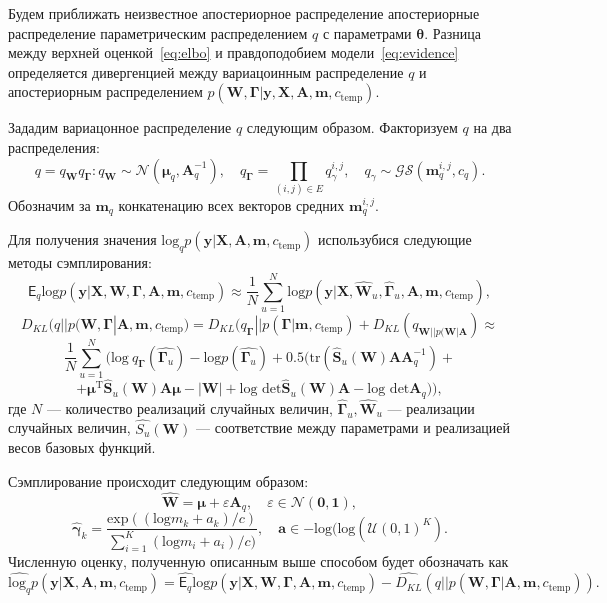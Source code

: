 Будем приближать неизвестное апостериорное распределение апостериорные распределение параметрическим распределением $q$ с параметрами $\boldsymbol{\theta}$.
Разница между верхней оценкой~\eqref{eq:elbo} и правдоподобием модели~\eqref{eq:evidence} определяется дивергенцией между вариацоинным распределение $q$ и апостериорным распределением $p(\mathbf{W}, \boldsymbol{\Gamma}|\mathbf{y}, \mathbf{X}, \mathbf{A},\mathbf{m}, c_{\text{temp}})$. 

Зададим вариацонное распределение $q$ следующим образом. 
Факторизуем $q$ на два распределения: 
$$q = q_{\mathbf{W}}q_{\boldsymbol{\Gamma}}:
q_{\mathbf{W}} \sim \mathcal{N}(\boldsymbol{\mu}_q, \mathbf{A}^{-1}_q), \quad q_{\boldsymbol{\Gamma}} = \prod_{(i,j) \in E} q_\gamma^{i,j}, \quad q_\gamma \sim \mathcal{GS}( \mathbf{m}_q^{i,j}, c_q).$$
Обозначим за $\mathbf{m}_q$ конкатенацию всех векторов средних  $\mathbf{m}_q^{i,j}$.

Для получения значения $\text{log}_q {p}(\mathbf{y}|\mathbf{X},\mathbf{A},\mathbf{m}, c_{\text{temp}})$ использубися следующие методы сэмплирования:
$$
    \mathsf{E}_{q}\text{log} p(\mathbf{y}|\mathbf{X},\mathbf{W}, \boldsymbol{\Gamma}, \mathbf{A},\mathbf{m}, c_{\text{temp}}) \approx \frac{1}{N}\sum_{u =1}^{N} \text{log} p(\mathbf{y}|\mathbf{X},\hat{\mathbf{W}}_u, \hat{\boldsymbol{\Gamma}}_u, \mathbf{A},\mathbf{m}, c_{\text{temp}}),
$$
$$
   {D_{KL}}(q||p(\mathbf{W}, \boldsymbol{\Gamma}| \mathbf{A},\mathbf{m}, c_{\text{temp}}) = {D_{KL}}(q_{\boldsymbol{\Gamma}}||p(\boldsymbol{\Gamma}| \mathbf{m}, c_{\text{temp}}) + {D_{KL}}(q_{\mathbf{W}||p(\mathbf{W}|\mathbf{A}}) \approx
$$
$$
    \frac{1}{N}\sum_{u=1}^N (\text{log}~q_{\boldsymbol{\Gamma}}(\hat{\boldsymbol{\Gamma}_u}) - \text{log}p(\hat{\boldsymbol{\Gamma}_u}) + 0.5(\text{tr}(\hat{\mathbf{S}}_u(\mathbf{W})\mathbf{A}\mathbf{A}_q^{-1}) + $$
$$+\boldsymbol{\mu}^{\text{T}}\hat{\mathbf{S}}_u(\mathbf{W})\mathbf{A}\boldsymbol{\mu} - |\mathbf{W}| + \text{log det}\hat{\mathbf{S}}_u(\mathbf{W})\mathbf{A} -  \text{log det}\mathbf{A}_q )),
$$
где $N$ --- количество реализаций случайных величин, $\hat{\boldsymbol{\Gamma}}_u, \hat{\mathbf{W}}_u$ --- реализации случайных величин, $\hat{S_u}(\mathbf{W})$ --- соответствие между параметрами и реализацией весов базовых функций.

Сэмплирование происходит следующим образом:
$$
    \hat{\mathbf{W}} = \boldsymbol{\mu} + \varepsilon\mathbf{A}_q, \quad \varepsilon \in \mathcal{N}(\mathbf{0}, \mathbf{1}),
$$
$$
    \hat{\boldsymbol{\gamma}}_k = \frac{\text{exp}((\text{log}{m}_k + a_k) / c )}{\sum_{i=1}^K (\text{log}{m}_i + a_i) / c )}, \quad \mathbf{a} \in -\text{log}(\text{log}(\mathcal{U}(0, 1)^K).
$$
Численную оценку, полученную описанным выше способом будет обозначать как 
$$\hat{\text{log}_q} {p}(\mathbf{y}|\mathbf{X},\mathbf{A},\mathbf{m}, c_{\text{temp}}) = \hat{\mathsf{E}_{q}}\text{log} p(\mathbf{y}|\mathbf{X},\mathbf{W}, \boldsymbol{\Gamma}, \mathbf{A},\mathbf{m}, c_{\text{temp}}) - \hat{D_{KL}}(q||p(\mathbf{W}, \boldsymbol{\Gamma}| \mathbf{A},\mathbf{m}, c_{\text{temp}})).$$

